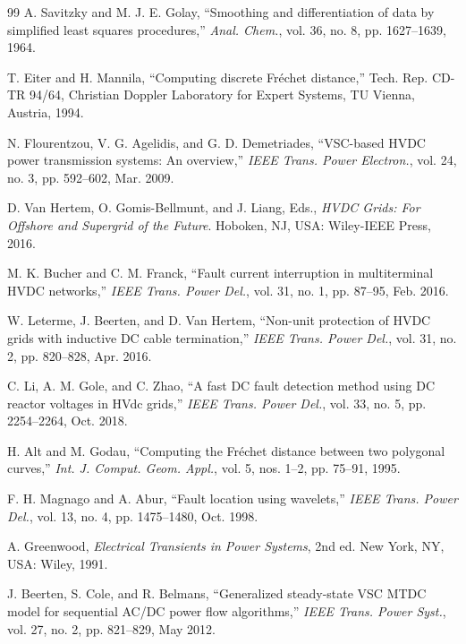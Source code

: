 \documentclass[journal]{IEEEtran}
\begin{document}
\begin{thebibliography}{99}
A. Savitzky and M. J. E. Golay, ``Smoothing and differentiation of data by simplified least squares procedures,'' \emph{Anal. Chem.}, vol. 36, no. 8, pp. 1627--1639, 1964.

T. Eiter and H. Mannila, ``Computing discrete Fr\'{e}chet distance,'' Tech. Rep. CD-TR 94/64, Christian Doppler Laboratory for Expert Systems, TU Vienna, Austria, 1994.


N. Flourentzou, V. G. Agelidis, and G. D. Demetriades, ``VSC-based HVDC power transmission systems: An overview,'' \emph{IEEE Trans. Power Electron.}, vol. 24, no. 3, pp. 592--602, Mar. 2009.

D. Van Hertem, O. Gomis-Bellmunt, and J. Liang, Eds., \emph{HVDC Grids: For Offshore and Supergrid of the Future}. Hoboken, NJ, USA: Wiley-IEEE Press, 2016.

M. K. Bucher and C. M. Franck, ``Fault current interruption in multiterminal HVDC networks,'' \emph{IEEE Trans. Power Del.}, vol. 31, no. 1, pp. 87--95, Feb. 2016.

W. Leterme, J. Beerten, and D. Van Hertem, ``Non-unit protection of HVDC grids with inductive DC cable termination,'' \emph{IEEE Trans. Power Del.}, vol. 31, no. 2, pp. 820--828, Apr. 2016.

C. Li, A. M. Gole, and C. Zhao, ``A fast DC fault detection method using DC reactor voltages in HVdc grids,'' \emph{IEEE Trans. Power Del.}, vol. 33, no. 5, pp. 2254--2264, Oct. 2018.

H. Alt and M. Godau, ``Computing the Fr\'{e}chet distance between two polygonal curves,'' \emph{Int. J. Comput. Geom. Appl.}, vol. 5, nos. 1--2, pp. 75--91, 1995.

F. H. Magnago and A. Abur, ``Fault location using wavelets,'' \emph{IEEE Trans. Power Del.}, vol. 13, no. 4, pp. 1475--1480, Oct. 1998.

A. Greenwood, \emph{Electrical Transients in Power Systems}, 2nd ed. New York, NY, USA: Wiley, 1991.

J. Beerten, S. Cole, and R. Belmans, ``Generalized steady-state VSC MTDC model for sequential AC/DC power flow algorithms,'' \emph{IEEE Trans. Power Syst.}, vol. 27, no. 2, pp. 821--829, May 2012.

\end{thebibliography}
\end{document}
